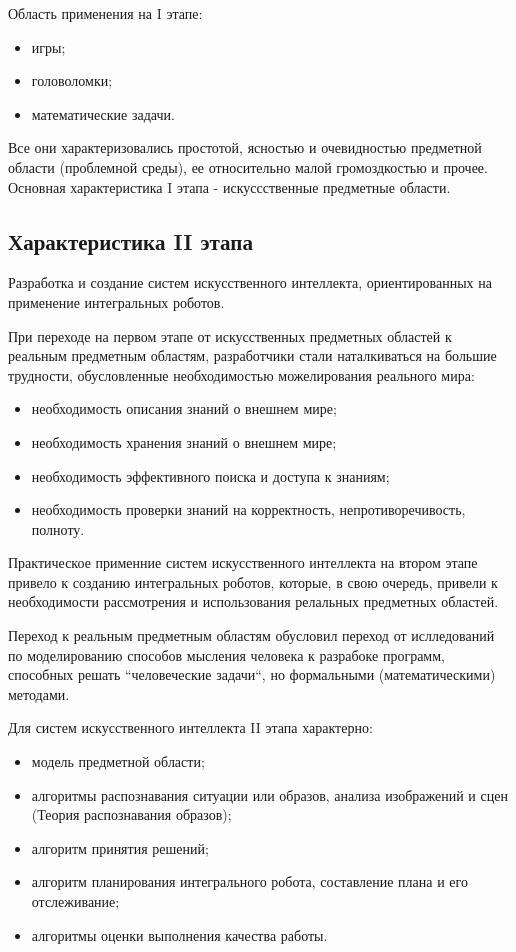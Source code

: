 \documentclass[a4paper,12pt]{report}
\begin{document}
	Область применения на I этапе:
	\begin{itemize}
		\item игры;
		\item головоломки;
		\item математические задачи.\\
	\end{itemize}

	Все они характеризовались простотой, ясностью и очевидностью предметной
	области (проблемной среды), ее относительно малой громоздкостью и прочее. \\

	Основная характеристика I этапа - искуссственные предметные области.


\subsection{Характеристика II этапа}
	Разработка и создание систем искусственного интеллекта,
	ориентированных на применение интегральных роботов. \par
	При переходе на первом этапе от искусственных предметных областей к реальным
	предметным областям, разработчики стали наталкиваться на большие трудности,
	обусловленные необходимостью можелирования реального мира:
	\begin{itemize}
		\item необходимость описания знаний о внешнем мире;
		\item необходимость хранения знаний о внешнем мире;
		\item необходимость эффективного поиска и доступа к знаниям;
		\item необходимость проверки знаний на корректность,
			непротиворечивость, полноту.\\
	\end{itemize}

	Практическое применние систем искусственного интеллекта на втором этапе
	привело к созданию интегральных роботов, которые, в свою очередь, привели к
	необходимости рассмотрения и использования релальных предметных областей.\par
	Переход к реальным предметным областям обусловил переход от ислледований по
	моделированию способов мысления человека к разрабоке программ, способных
	решать ``человеческие задачи``, но формальными (математическими)
	методами.\par
	Для систем искусственного интеллекта II этапа характерно:
	\begin{itemize}
		\item модель предметной области;
		\item алгоритмы распознавания ситуации или образов, анализа изображений и
			сцен (Теория распознавания образов);
		\item алгоритм принятия решений;
		\item алгоритм планирования интегрального робота, составление плана и его
			отслеживание;
		\item алгоритмы оценки выполнения качества работы.\\
	\end{itemize}
\end{document}
